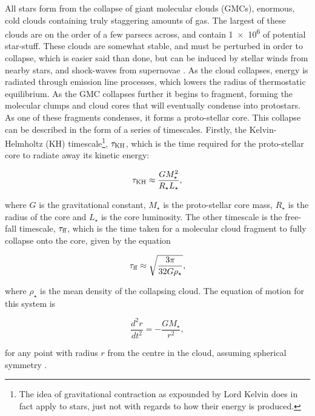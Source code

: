 All stars form from the collapse of giant molecular clouds (GMCs), enormous, cold clouds containing truly staggering amounts of gas.
The largest of these clouds are on the order of a few parsecs across, and contain \SI{1e6}{\solarmass} of potential star-stuff.
These clouds are somewhat stable, and must be perturbed in order to collapse, which is easier said than done, but can be induced by stellar winds from nearby stars, and shock-waves from supernovae
\parencite[Ch.~3]{bodenheimerPrinciplesStarFormation2011}.
As the cloud collapses, energy is radiated through emission line processes, which lowers the radius of thermostatic equilibrium.
As the GMC collapses further it begins to fragment, forming the molecular clumps and cloud cores that will eventually condense into protostars.
As one of these fragments condenses, it forms a proto-stellar core.
This collapse can be described in the form of a series of timescales.
Firstly, the Kelvin-Helmholtz (KH) timescale\footnote{The idea of gravitational contraction as expounded by Lord Kelvin does in fact apply to stars, just not with regards to how their energy is produced.}, $\tau_\text{KH}$, which is the time required for the proto-stellar core to radiate away its kinetic energy:

\begin{equation}
  \label{eq:khtime}
  \tau_\text{KH} \approx \frac{G M_\star^2}{R_\star L_\star},  
\end{equation}

\noindent
where $G$ is the gravitational constant, $M_\star$ is the proto-stellar core mass, $R_\star$ is the radius of the core and $L_\star$ is the core luminosity.
The other timescale is the free-fall timescale, $\tau_\text{ff}$, which is the time taken for a molecular cloud fragment to fully collapse onto the core, given by the equation

\begin{equation}
  \label{eq:fftime}
  \tau_\text{ff} \approx \sqrt{\frac{3\pi}{32 G \rho_\star}} ,
\end{equation}

\noindent
where $\rho_\star$ is the mean density of the collapsing cloud.
The equation of motion for this system is

\begin{equation}
  \frac{d^2r}{dt^2} = - \frac{GM_\star}{r^2} ,
\end{equation}

\noindent
for any point with radius $r$ from the centre in the cloud, assuming spherical symmetry \parencite[96]{ward-thompsonIntroductionStarFormation2011}.


